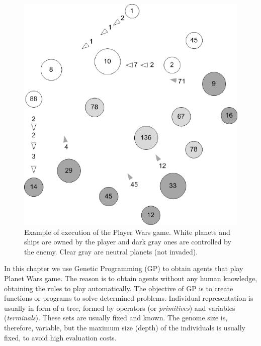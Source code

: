 \begin{figure}
\includegraphics[scale =0.7] {gfx/rts/naves.pdf}

\caption{Example of execution of the Player Wars game. White planets and ships are owned by the player and dark gray ones are controlled by the enemy. Clear gray are neutral planets (not invaded).}
\label{fig:naves}
\end{figure}


In this chapter we use Genetic Programming (GP) to obtain agents that play
Planet Wars game. The reason is to obtain agents without any human knowledge, obtaining the rules to play automatically.%
The objective of GP is to create functions or programs to solve determined problems. Individual representation is usually in form of a tree, formed by operators (or {\em primitives}) and variables ({\em terminals}). These sets are usually fixed and known. The genome size is, therefore, variable, but the maximum size (depth) of the individuals is usually fixed, to avoid high evaluation costs. %


